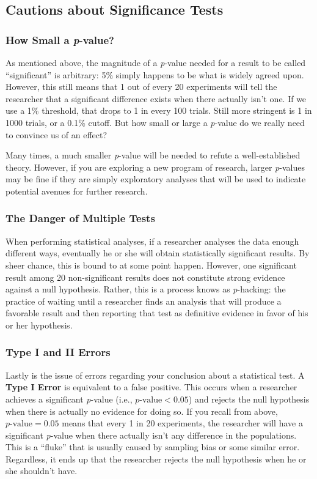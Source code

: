 \subsection{Cautions about Significance Tests}
\subsubsection{How Small a \textit{p}-value?}
As mentioned above, the magnitude of a \textit{p}-value needed for a result to be called ``significant'' is arbitrary: 5\% simply happens to be what is widely agreed upon. However, this still means that 1 out of every 20 experiments will tell the researcher that a significant difference exists when there actually isn't one. If we use a 1\% threshold, that drops to 1 in every 100 trials. Still more stringent is 1 in 1000 trials, or a 0.1\% cutoff. But how small or large a \textit{p}-value do we really need to convince us of an effect?

Many times, a much smaller \textit{p}-value will be needed to refute a well-established theory. However, if you are exploring a new program of research, larger \textit{p}-values may be fine if they are simply exploratory analyses that will be used to indicate potential avenues for further research.

\subsubsection{The Danger of Multiple Tests}
When performing statistical analyses, if a researcher analyses the data enough different ways, eventually he or she will obtain statistically significant results. By sheer chance, this is bound to at some point happen. However, one significant result among 20 non-significant results does not constitute strong evidence against a null hypothesis. Rather, this is a process knows as \textit{p}-hacking: the practice of waiting until a researcher finds an analysis that will produce a favorable result and then reporting that test as definitive evidence in favor of his or her hypothesis.

\subsubsection{Type I and II Errors}
Lastly is the issue of errors regarding your conclusion about a statistical test. A \textbf{Type I Error} is equivalent to a false positive. This occurs when a researcher achieves a significant \textit{p}-value (i.e., $p\text{-value}<0.05$) and rejects the null hypothesis when there is actually no evidence for doing so. If you recall from above, $p\text{-value}=0.05$ means that every 1 in 20 experiments, the researcher will have a significant \textit{p}-value when there actually isn't any difference in the populations. This is a ``fluke'' that is usually caused by sampling bias or some similar error. Regardless, it ends up that the researcher rejects the null hypothesis when he or she shouldn't have.

